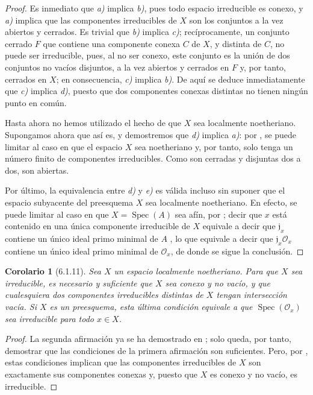 \documentclass[oneside]{amsart}
\theoremstyle{ega-env-style}
\theoremstyle{ega-thm-env-style}
\newtheorem*{corollary}{Corolario}
\theoremstyle{ega-defn-env-style}
\newcommand{\oldpage}[2][]{{\marginnote{\normalfont{\textbf{#1}~|~#2}}}\ignorespaces}
\let\EGAOriginalLabel\label
\renewcommand{\label}[1]{\phantomsection\EGAOriginalLabel{#1}}
\begin{document}
\begin{proof}
Es inmediato que \emph{a)} implica \emph{b)}, pues todo espacio irreducible es conexo, y \emph{a)} implica que las componentes irreducibles de $X$ son los conjuntos a la vez abiertos y cerrados.
Es trivial que \emph{b)} implica \emph{c)}; recíprocamente, un conjunto cerrado $F$ que contiene
\oldpage[I]{143}
una componente conexa $C$ de $X$, y distinta de $C$, no puede ser irreducible, pues, al no ser conexo, este conjunto es la unión de dos conjuntos no vacíos disjuntos, a la vez abiertos y cerrados en $F$ y, por tanto, cerrados en $X$; en consecuencia, \emph{c)} implica \emph{b)}.
De aquí se deduce inmediatamente que \emph{c)} implica \emph{d)}, puesto que dos componentes conexas distintas no tienen ningún punto en común.

Hasta ahora no hemos utilizado el hecho de que $X$ sea localmente noetheriano.
Supongamos ahora que así es, y demostremos que \emph{d)} implica \emph{a)}: por , se puede limitar al caso en que el espacio $X$ sea noetheriano y, por tanto, solo tenga un número finito de componentes irreducibles.
Como son cerradas y disjuntas dos a dos, son abiertas.

Por último, la equivalencia entre \emph{d)} y \emph{e)} es válida incluso sin suponer que el espacio subyacente del preesquema $X$ sea localmente noetheriano.
En efecto, se puede limitar al caso en que $X=\operatorname{Spec}(A)$ sea afín, por ;
decir que $x$ está contenido en una única componente irreducible de $X$ equivale a decir que $\mathfrak{j}_x$ contiene un único ideal primo minimal de $A$ , lo que equivale a decir que $\mathfrak{j}_x\mathscr{O}_x$ contiene un único ideal primo minimal de $\mathscr{O}_x$, de donde se sigue la conclusión.
\end{proof}

\begin{corollary}[6.1.11]
\label{I.6.1.11}
Sea $X$ un espacio localmente noetheriano.
Para que $X$ sea irreducible, es necesario y suficiente que $X$ sea conexo y no vacío, y que cualesquiera dos componentes irreducibles distintas de $X$ tengan intersección vacía.
Si $X$ es un preesquema, esta última condición equivale a que $\operatorname{Spec}(\mathscr{O}_x)$ sea irreducible para todo $x\in X$.
\end{corollary}

\begin{proof}
La segunda afirmación ya se ha demostrado en ;
solo queda, por tanto, demostrar que las condiciones de la primera afirmación son suficientes.
Pero, por , estas condiciones implican que las componentes irreducibles de $X$ son exactamente sus componentes conexas y, puesto que $X$ es conexo y no vacío, es irreducible.
\end{proof}
\end{document}
